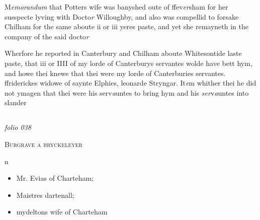 \documentclass[12pt, a4paper]{book}
\begin{document}
		\ifthenelse{\isodd{\thepage}}
		{\reversemarginpar}
		{\normalmarginpar}
		 M\textit{emorandum} that Potters wife was banyshed oute of ffev\textit{er}sham for
 		her susspecte lyving with Docto\textit{r} Willoughby, and also was
 		compellid to forsake Chilham for the same aboute ii or iii
 		yeres paste, and yet she remayneth in the company of
 		the said docto\textit{r}
 

	
		\ifthenelse{\isodd{\thepage}}
		{\reversemarginpar}
		{\normalmarginpar}
		Wherfore he reported in Canterbury and Chilham aboute
		Whitesontide laste paste, that iii or IIII of
			 my lorde of Canterburys
 servantes wolde have bett hym, and howe thei knewe that thei
 were my lorde of Canterburies servantes. ffriderickes widowe
 of saynte Elphies, leonarde Stryngar.
 It\textit{e}m whither thei he did not ymagen that thei were his serv\textit{a}untes
 to bring hym and his \textit{ser}v\textit{a}untes into slander


            
\dotfill
					  \subsection*{}

\textit{folio 038}


            

				\begin{center} \begin{large} {\scshape Burgrave a bryckeleyer} \end{large} \end{center}
			
 n
 	\begin{itemize}
 		\item[]Mr. Evias of Charteham;
 		\item[]Maistres dartenall;
 		\item[]mydeltons wife of Charteham
 	\end{itemize}
			
 

            

	
				\marginpar[\vspace{0.5cm}{\textcolor{Gray}{n}}]{}
			
\end{document}
